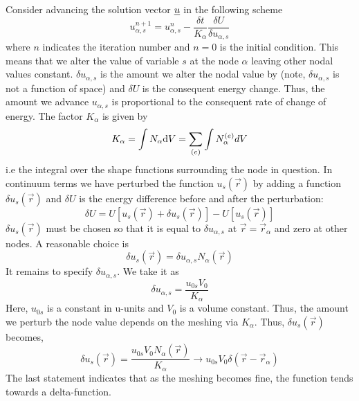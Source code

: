 \documentclass[a4paper]{article}
\begin{document}
Consider advancing the solution vector ${\underline{u}}$ in the following scheme
\begin{equation}
  u_{\alpha,s}^{n+1}=u_{\alpha,s}^n-\frac{\delta t}{K_\alpha} 
  \frac{\delta U}{\delta u_{\alpha,s}}
\label{titer}
\end{equation}
where $n$ indicates the iteration number and $n=0$ is the initial
condition. This means that we alter the value of variable $s$ at the
node $\alpha$ leaving other nodal values constant. $\delta
u_{\alpha,s}$ is the amount we alter the nodal value by (note, $\delta
u_{\alpha,s}$ is not a function of space) and $\delta U$
is the consequent energy change. Thus, the amount we advance
$u_{\alpha,s}$ is proportional to the consequent rate of change of
energy. The factor $K_\alpha$ is given by
\begin{equation}
  K_\alpha=\int N_\alpha \mathrm{d} V=\sum_{(e)}\int N_\alpha^{(e)} dV  
\end{equation}
i.e the integral over the shape functions surrounding the node in
question. In continuum terms we have perturbed the function $u_s(\vec
r)$ by adding a function $\delta u_s(\vec r)$ and $\delta U$ is the
energy difference before and after the perturbation:
\begin{equation}
  \delta U=U[u_s(\vec r)+\delta u_s(\vec r)]-U[u_s(\vec r)]
\end{equation}
$\delta u_s(\vec r)$ must be chosen so that it is equal to $\delta
u_{\alpha,s}$ at $\vec r=\vec r_\alpha$ and zero at other nodes. A
reasonable choice is
\begin{equation}
  \delta u_s(\vec r)=\delta u_{\alpha,s} N_\alpha(\vec r)
\end{equation}
It remains to specify $\delta u_{\alpha,s}$. We take it as
\begin{equation}
  \delta u_{\alpha,s}=\frac{u_{0s} V_0}{K_\alpha}  
\label{duas}
\end{equation}
Here, $u_{0s}$ is a constant in u-units and $V_0$ is a volume constant.
Thus, the amount we perturb the node value depends on the meshing
via $K_\alpha$. Thus, $\delta u_s(\vec r)$ becomes,
\begin{equation}
  \delta u_s(\vec r)=\frac{u_{0s}V_0 N_\alpha(\vec r)}{K_\alpha}
\to u_{0s}V_0\delta(\vec r-\vec r_\alpha)
\label{dus}
\end{equation}
The last statement indicates that as the meshing becomes fine, the
function tends towards a delta-function.
\end{document}
